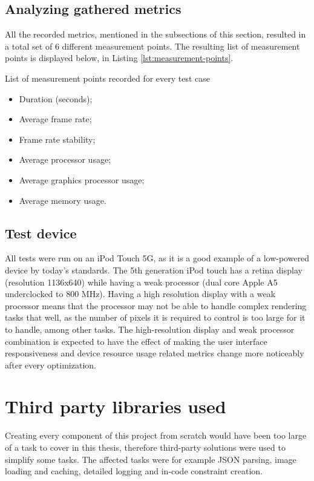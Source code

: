 \documentclass[a4paper,12pt]{article}
\begin{document}
\subsection{Analyzing gathered metrics}
All the recorded metrics, mentioned in the subsections of this section, resulted in a total set of 6 different measurement points. The resulting list of measurement points is displayed below, in Listing \autoref{lst:measurement-points}.

\begin{listing}[H]
  \caption{List of measurement points recorded for every test case}
  \label{lst:measurement-points}
  \begin{itemize}
    \item Duration (seconds);
    \item Average frame rate;
    \item Frame rate stability;
    \item Average processor usage;
    \item Average graphics processor usage;
    \item Average memory usage.
  \end{itemize}
\end{listing}

\subsection{Test device}
All tests were run on an iPod Touch 5G, as it is a good example of a low-powered device by today's standards. The 5th generation iPod touch has a retina display (resolution 1136x640)\cite{AppleIPodTouch5G} while having a weak \cite{IPhoneVsIPod5} processor (dual core Apple A5 underclocked to 800 MHz)\cite{MacObserverUnderclock}. Having a high resolution display with a weak processor means that the processor may not be able to handle complex rendering tasks that well, as the number of pixels it is required to control is too large for it to handle, among other tasks.\cite{RetinaAndWeakProcessor} The high-resolution display and weak processor combination is expected to have the effect of making the user interface responsiveness and device resource usage related metrics change more noticeably after every optimization.

\section{Third party libraries used}
Creating every component of this project from scratch would have been too large of a task to cover in this thesis, therefore third-party solutions were used to simplify some tasks. The affected tasks were for example JSON parsing, image loading and caching, detailed logging and in-code constraint creation.
\end{document}
